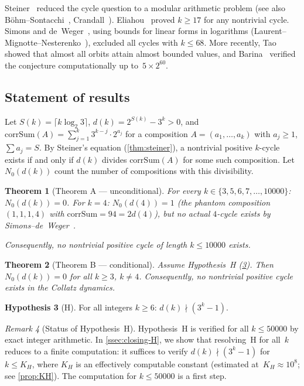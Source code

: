 \documentclass[11pt, a4paper]{amsart}
\theoremstyle{plain}
\newtheorem{theorem}{Theorem}[section]
\theoremstyle{definition}
\newtheorem{hypothesis}[theorem]{Hypothesis}
\theoremstyle{remark}
\newtheorem{remark}[theorem]{Remark}
\newcommand{\corrSum}{\mathrm{corrSum}}
\begin{document}
Steiner~\cite{Steiner1977} reduced the cycle question to a
modular arithmetic problem
(see also B\"ohm--Sontacchi~\cite{BoehmSontacchi1978},
Crandall~\cite{Crandall1978}).
Eliahou~\cite{Eliahou1993} proved $k \geq 17$ for any
nontrivial cycle.
Simons and de~Weger~\cite{SimonsDeWeger2005}, using bounds for
linear forms in logarithms (Laurent--Mignotte--Nesterenko~\cite{LMN1995}),
excluded all cycles with $k \leq 68$.
More recently, Tao~\cite{Tao2022} showed that almost all
orbits attain almost bounded values, and Barina~\cite{Barina2021}
verified the conjecture computationally up to~$5 \times 2^{60}$.

\subsection{Statement of results}\label{ssec:results}

Let $S(k) = \lceil k \log_2 3 \rceil$,
$d(k) = 2^{S(k)} - 3^k > 0$, and
$\corrSum(A) = \sum_{j=1}^{k} 3^{k-j} \cdot 2^{a_j}$
for a composition $A = (a_1, \ldots, a_k)$ with
$a_j \geq 1$, $\sum a_j = S$.
By Steiner's equation (\cref{thm:steiner}), a nontrivial positive
$k$-cycle exists if and only if $d(k)$ divides $\corrSum(A)$ for
some such composition.  Let $N_0(d(k))$ count the number of
compositions with this divisibility.

\begin{theorem}[Theorem A --- unconditional]\label{thm:A}
  For every $k \in \{3, 5, 6, 7, \ldots, 10000\}$:
  $N_0(d(k)) = 0$.
  For $k = 4$: $N_0(d(4)) = 1$ (the phantom composition
  $(1,1,1,4)$ with $\corrSum = 94 = 2d(4)$), but no actual
  $4$-cycle exists by Simons--de~Weger~\cite{SimonsDeWeger2005}.

  Consequently, no nontrivial positive cycle of length
  $k \leq 10000$ exists.
\end{theorem}

\begin{theorem}[Theorem B --- conditional]\label{thm:B}
  Assume Hypothesis~H (\cref{hyp:H}).
  Then $N_0(d(k)) = 0$ for all $k \geq 3$, $k \neq 4$.
  Consequently, no nontrivial positive cycle exists in the
  Collatz dynamics.
\end{theorem}

\begin{hypothesis}[H]\label{hyp:H}
  For all integers $k \geq 6$:
  \;$d(k) \nmid (3^k - 1)$.
\end{hypothesis}

\begin{remark}[Status of Hypothesis~H]\label{rem:H-status}
  Hypothesis~H is verified for all $k \leq 50000$ by exact
  integer arithmetic.  In \cref{ssec:closing-H}, we show that
  resolving~H for all~$k$ reduces to a finite computation:
  it suffices to verify $d(k) \nmid (3^k-1)$ for
  $k \leq K_H$, where $K_H$ is an effectively computable
  constant (estimated at~$K_H \approx 10^8$; see
  \cref{prop:KH}).  The computation for $k \leq 50000$ is
  a first step.
\end{remark}
\end{document}

